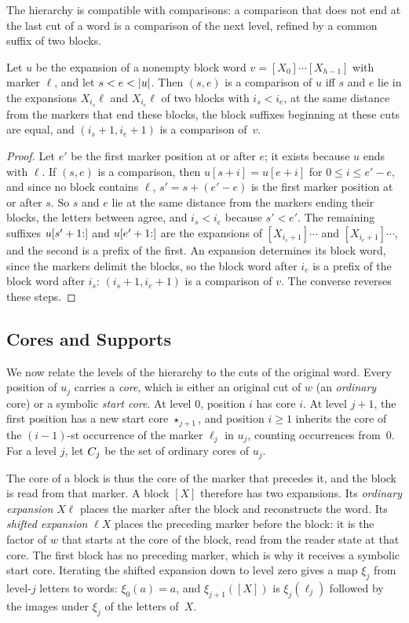 The hierarchy is compatible with comparisons: a comparison that does not end at the last
cut of a word is a comparison of the next level, refined by a common suffix of two blocks.

\begin{lemma}[Alignment]\label{lem:alignment}
Let $u$ be the expansion of a nonempty block word $v = [X_0]\cdots[X_{h-1}]$ with marker
$\ell$, and let $s < e < \lvert u\rvert$. Then $(s,e)$ is a comparison of $u$ iff $s$ and $e$ lie in
the expansions $X_{i_s}\ell$ and $X_{i_e}\ell$ of two blocks with $i_s < i_e$, at the same
distance from the markers that end these blocks, the block suffixes beginning at these cuts
are equal, and $(i_s+1, i_e+1)$ is a comparison of~$v$.
\end{lemma}

\begin{proof}
Let $e'$ be the first marker position at or after $e$; it exists because $u$ ends with
$\ell$. If $(s,e)$ is a comparison, then $u[s+i] = u[e+i]$ for $0 \le i \le e'-e$, and since no
block contains $\ell$, $s' = s + (e'-e)$ is the first marker position at or after $s$. So $s$
and $e$ lie at the same distance from the markers ending their blocks, the letters between
agree, and $i_s < i_e$ because $s' < e'$. The remaining suffixes $u[s'+1{:}]$ and
$u[e'+1{:}]$ are the expansions of $[X_{i_s+1}]\cdots$ and $[X_{i_e+1}]\cdots$, and the
second is a prefix of the first. An expansion determines its block word, since the markers
delimit the blocks, so the block word after $i_e$ is a prefix of the block word after $i_s$:
$(i_s+1,i_e+1)$ is a comparison of $v$. The converse reverses these steps.
\end{proof}

\subsection{Cores and Supports}

We now relate the levels of the hierarchy to the cuts of the original word. Every position
of $u_j$ carries a \emph{core}, which is either an original cut of $w$ (an \emph{ordinary}
core) or a symbolic \emph{start core}. At level $0$, position $i$ has core $i$. At level
$j+1$, the first position has a new start core $\star_{j+1}$, and position $i \ge 1$ inherits
the core of the $(i-1)$-st occurrence of the marker $\ell_j$ in $u_j$, counting occurrences
from~$0$. For a level $j$, let $C_j$ be the set of ordinary cores of $u_j$.

The core of a block is thus the core of the marker that precedes it, and the block
is read from that marker. A block $[X]$ therefore has two expansions. Its
\emph{ordinary expansion} $X\ell$ places the marker after the block and
reconstructs the word. Its \emph{shifted expansion} $\ell X$ places the preceding
marker before the block: it is the factor of $w$ that starts at the core of the
block, read from the reader state at that core. The first block has no preceding
marker, which is why it receives a symbolic start core. Iterating the shifted
expansion down to level zero gives a map $\xi_j$ from level-$j$ letters to words:
$\xi_0(a) = a$, and $\xi_{j+1}([X])$ is $\xi_j(\ell_j)$ followed by the images
under $\xi_j$ of the letters of~$X$.

